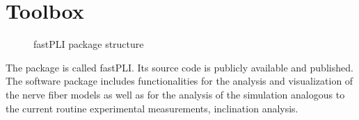 \section{Toolbox}
% 
\begin{figure}[!ht]
\centering
\caption[\acs{fastPLI}]{\ac{fastPLI} package structure}
\label{fig:fastpli}
\end{figure}
% 
The \python{} package is called \ac{fastPLI}.
Its source code is publicly available and \cite{fastpli,Matuschke2021} published.
The software package includes functionalities for the analysis and visualization of the nerve fiber models as well as for the analysis of the simulation analogous to the current routine experimental measurements, \eg{} inclination analysis.
% 
% 
% 
